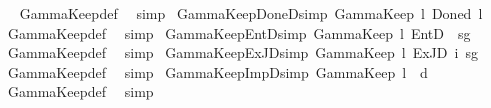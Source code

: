 \begin{isabellebody}
\isadelimproof
\ %
\endisadelimproof
%
\isatagproof
{}\isamarkupfalse%
\ GammaKeep{\isacharunderscore}{\kern0pt}def\ \isamarkupfalse%
\ simp%
\endisatagproof
{\isafoldproof}%
%
\isadelimproof
%
\endisadelimproof
\isanewline
{}\isamarkupfalse%
\ GammaKeep{\isacharunderscore}{\kern0pt}DoneD{\isacharbrackleft}{\kern0pt}simp{\isacharbrackright}{\kern0pt}{\isacharcolon}{\kern0pt}\ {\isachardoublequoteopen}GammaKeep\ l\ {\isacharparenleft}{\kern0pt}Done\isactrlsup d\ l{\isacharprime}{\kern0pt}{\isacharparenright}{\kern0pt}{\isachardoublequoteclose}%
\isadelimproof
\ %
\endisadelimproof
%
\isatagproof
{}\isamarkupfalse%
\ GammaKeep{\isacharunderscore}{\kern0pt}def\ \isamarkupfalse%
\ simp%
\endisatagproof
{\isafoldproof}%
%
\isadelimproof
%
\endisadelimproof
\isanewline
{}\isamarkupfalse%
\ GammaKeep{\isacharunderscore}{\kern0pt}EntD{\isacharbrackleft}{\kern0pt}simp{\isacharbrackright}{\kern0pt}{\isacharcolon}{\kern0pt}\ {\isachardoublequoteopen}GammaKeep\ l\ {\isacharparenleft}{\kern0pt}EntD\ {\isasymPhi}\ sg\ {\isasymphi}{\isacharparenright}{\kern0pt}{\isachardoublequoteclose}%
\isadelimproof
\ %
\endisadelimproof
%
\isatagproof
{}\isamarkupfalse%
\ GammaKeep{\isacharunderscore}{\kern0pt}def\ \isamarkupfalse%
\ simp%
\endisatagproof
{\isafoldproof}%
%
\isadelimproof
%
\endisadelimproof
\isanewline
{}\isamarkupfalse%
\ GammaKeep{\isacharunderscore}{\kern0pt}ExJD{\isacharbrackleft}{\kern0pt}simp{\isacharbrackright}{\kern0pt}{\isacharcolon}{\kern0pt}\ {\isachardoublequoteopen}GammaKeep\ l\ {\isacharparenleft}{\kern0pt}ExJD\ i\ sg\ {\isasymphi}{\isacharparenright}{\kern0pt}{\isachardoublequoteclose}%
\isadelimproof
\ %
\endisadelimproof
%
\isatagproof
{}\isamarkupfalse%
\ GammaKeep{\isacharunderscore}{\kern0pt}def\ \isamarkupfalse%
\ simp%
\endisatagproof
{\isafoldproof}%
%
\isadelimproof
%
\endisadelimproof
\isanewline
{}\isamarkupfalse%
\ GammaKeep{\isacharunderscore}{\kern0pt}ImpD{\isacharbrackleft}{\kern0pt}simp{\isacharbrackright}{\kern0pt}{\isacharcolon}{\kern0pt}\ {\isachardoublequoteopen}GammaKeep\ l\ {\isacharparenleft}{\kern0pt}{\isasymphi}\ {\isasymsupset}\isactrlsup d\ {\isasympsi}{\isacharparenright}{\kern0pt}{\isachardoublequoteclose}%
\isadelimproof
\ %
\endisadelimproof
%
\isatagproof
{}\isamarkupfalse%
\ GammaKeep{\isacharunderscore}{\kern0pt}def\ \isamarkupfalse%
\ simp%

\end{isabellebody}
